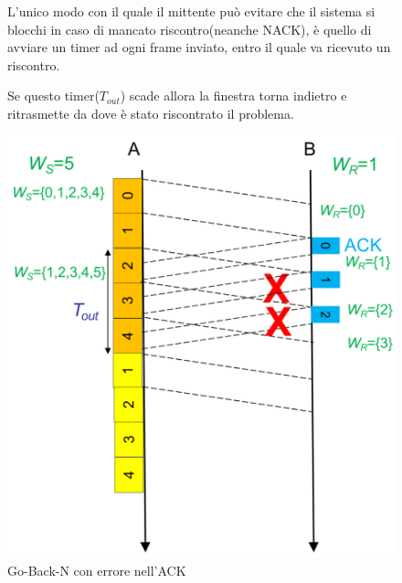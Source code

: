 \begin{figure}[htbp]
    \centering
    \begin{minipage}{0.55\textwidth}
        L'unico modo con il quale il mittente può evitare che il sistema si blocchi in caso di mancato riscontro(neanche NACK),  è quello di avviare un timer ad ogni frame inviato, entro il quale va ricevuto un riscontro.
        
        Se questo timer($T_{out}$) scade allora la finestra torna indietro e ritrasmette da dove è stato riscontrato il problema.
    \end{minipage}%
    \hfill
    \begin{minipage}{0.4\textwidth}
        \includegraphics[width=\linewidth]{images/gobacknerroreack.png}
        \caption{Go-Back-N con errore nell'ACK}
    \end{minipage}
\end{figure}

\newpage


